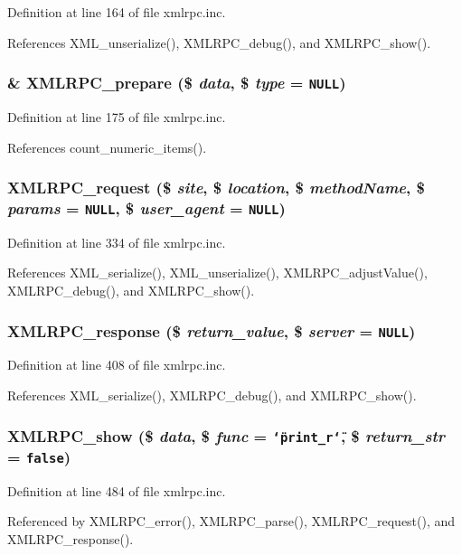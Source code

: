 Definition at line 164 of file xmlrpc.inc.

References XML\_\-unserialize(), XMLRPC\_\-debug(), and XMLRPC\_\-show().\hypertarget{xmlrpc_8inc_c13be54b26e0803d8745e4f019dcfd8a}{
\subsubsection{\setlength{\rightskip}{0pt plus 5cm}\& XMLRPC\_\-prepare (\$ {\em data}, \$ {\em type} = {\tt NULL})}}
\label{xmlrpc_8inc_c13be54b26e0803d8745e4f019dcfd8a}




Definition at line 175 of file xmlrpc.inc.

References count\_\-numeric\_\-items().\hypertarget{xmlrpc_8inc_3a98b6984b8ca01752d1aa9a267526a3}{
\subsubsection{\setlength{\rightskip}{0pt plus 5cm}XMLRPC\_\-request (\$ {\em site}, \$ {\em location}, \$ {\em methodName}, \$ {\em params} = {\tt NULL}, \$ {\em user\_\-agent} = {\tt NULL})}}
\label{xmlrpc_8inc_3a98b6984b8ca01752d1aa9a267526a3}




Definition at line 334 of file xmlrpc.inc.

References XML\_\-serialize(), XML\_\-unserialize(), XMLRPC\_\-adjustValue(), XMLRPC\_\-debug(), and XMLRPC\_\-show().\hypertarget{xmlrpc_8inc_c736d378caaccdd0726ea1080d1f526f}{
\subsubsection{\setlength{\rightskip}{0pt plus 5cm}XMLRPC\_\-response (\$ {\em return\_\-value}, \$ {\em server} = {\tt NULL})}}
\label{xmlrpc_8inc_c736d378caaccdd0726ea1080d1f526f}




Definition at line 408 of file xmlrpc.inc.

References XML\_\-serialize(), XMLRPC\_\-debug(), and XMLRPC\_\-show().\hypertarget{xmlrpc_8inc_1f60d2672bcb35f5ff908f64931f8d48}{
\subsubsection{\setlength{\rightskip}{0pt plus 5cm}XMLRPC\_\-show (\$ {\em data}, \$ {\em func} = {\tt \char`\"{}print\_\-r\char`\"{}}, \$ {\em return\_\-str} = {\tt false})}}
\label{xmlrpc_8inc_1f60d2672bcb35f5ff908f64931f8d48}




Definition at line 484 of file xmlrpc.inc.

Referenced by XMLRPC\_\-error(), XMLRPC\_\-parse(), XMLRPC\_\-request(), and XMLRPC\_\-response().